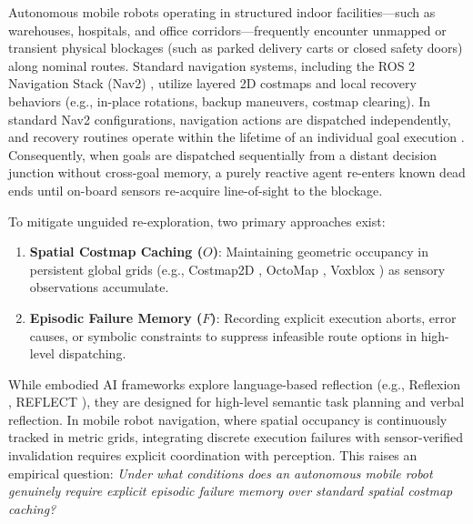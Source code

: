 Autonomous mobile robots operating in structured indoor facilities---such as warehouses, hospitals, and office corridors---frequently encounter unmapped or transient physical blockages (such as parked delivery carts or closed safety doors) along nominal routes. Standard navigation systems, including the ROS 2 Navigation Stack (Nav2) \cite{macenski2020marathon2, macenski2022ros2}, utilize layered 2D costmaps \cite{lu2014layered} and local recovery behaviors (e.g., in-place rotations, backup maneuvers, costmap clearing). In standard Nav2 configurations, navigation actions are dispatched independently, and recovery routines operate within the lifetime of an individual goal execution \cite{macenski2020marathon2}. Consequently, when goals are dispatched sequentially from a distant decision junction without cross-goal memory, a purely reactive agent re-enters known dead ends until on-board sensors re-acquire line-of-sight to the blockage.

To mitigate unguided re-exploration, two primary approaches exist:
\begin{enumerate}
    \item \textbf{Spatial Costmap Caching ($O$)}: Maintaining geometric occupancy in persistent global grids (e.g., Costmap2D \cite{lu2014layered}, OctoMap \cite{hornung2013octomap}, Voxblox \cite{oleynikova2017voxblox}) as sensory observations accumulate.
    \item \textbf{Episodic Failure Memory ($F$)}: Recording explicit execution aborts, error causes, or symbolic constraints to suppress infeasible route options in high-level dispatching.
\end{enumerate}

While embodied AI frameworks explore language-based reflection (e.g., Reflexion \cite{shinn2023reflexion}, REFLECT \cite{liu2023reflect}), they are designed for high-level semantic task planning and verbal reflection. In mobile robot navigation, where spatial occupancy is continuously tracked in metric grids, integrating discrete execution failures with sensor-verified invalidation requires explicit coordination with perception. This raises an empirical question: \emph{Under what conditions does an autonomous mobile robot genuinely require explicit episodic failure memory over standard spatial costmap caching?}

